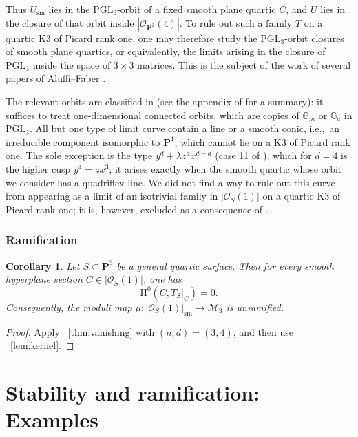 \documentclass[a4paper,12pt,twoside,reqno]{amsart}
\makeatletter
\numberwithin{equation}{section}
\def\cr@pref#1:#2\@nil{#1}
\newcommand{\cr@tsing}[1]{\@nameuse{cr@map@\cr@pref#1:\@nil}}
\newcommand{\Cref}[1]{\cr@tsing{#1}~\ref{#1}}
\theoremstyle{plain}
\newtheorem{corollary}[theorem]{Corollary}
\theoremstyle{definition}
\newcommand{\PP}{\mathbf{P}}
\newcommand{\Oc}{\mathscr{O}}
\newcommand{\sm}{\mathrm{sm}}
\newcommand{\Mmod}{\mathscr{M}}
\newcommand{\HH}{\mathrm{H}}
\newcommand{\OO}{\mathscr{O}}
\theoremstyle{plain}
\theoremstyle{definition}
\makeatother
\begin{document}
Thus $U_{\sm}$ lies in the $\mathrm{PGL}_3$-orbit of a fixed smooth plane quartic $C$, and $U$ lies in the closure of that orbit inside $|\OO_{\PP^2}(4)|$. To rule out such a family $T$ on a quartic K3 of Picard rank one, one may therefore study the $\mathrm{PGL}_3$-orbit closures of smooth plane quartics, or equivalently, the limits arising in the closure of $\mathrm{PGL}_3$ inside the space of $3\times3$ matrices. This is the subject of the work of several papers of Aluffi--Faber \cite{aluffifaber0, aluffifaber1,aluffifaber2}.

The relevant orbits are classified in \cite[Section~1]{aluffifaber0} (see the appendix of \cite{aluffifaber1} for a summary): it suffices to treat one-dimensional connected orbits, which are copies of $\mathbb G_m$ or $\mathbb G_a$ in $\mathrm{PGL}_3$. All but one type of limit curve contain a line or a smooth conic, i.e.,\ an irreducible component isomorphic to $\PP^1$, which cannot lie on a K3 of Picard rank one. The sole exception is the type $y^d+\lambda z^a x^{d-a}$ (case 11 of \cite[Appendix]{aluffifaber1}), which for $d=4$ is the higher cusp $y^4=zx^3$; it arises exactly when the smooth quartic whose orbit we consider has a quadriflex line. We did not find a way to rule out this curve from appearing as a limit of an isotrivial family in $|\OO_S(1)|$ on a quartic K3 of Picard rank one; it is, however, excluded as a consequence of \cite{CG}.

\subsubsection{Ramification}

\begin{corollary}\label{cor:quartic-unramified}
Let $S\subset\PP^3$ be a general quartic surface. Then for every smooth hyperplane section $C\in|\Oc_S(1)|$, one has
\[
   \HH^0(C,T_S|_C)=0.
\]
Consequently, the moduli map $\mu\colon|\Oc_S(1)|_{\sm}\to\Mmod_3$ is unramified.
\end{corollary}

\begin{proof}
Apply \Cref{thm:vanishing} with $(n,d)=(3,4)$, and then use \Cref{lem:kernel}.
\end{proof}

\section{Stability and ramification: Examples}\label{sec:stability-ramification}
\end{document}
